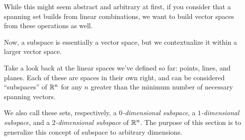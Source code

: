 \documentclass{ximera}
\begin{document}
  While this might seem abstract and arbitrary at first, if you consider that a spanning set builds from linear combinations, we want to build vector spaces from these operations as well.

  Now, a subspace is essentially a vector space, but we contextualize it within a larger vector space.

Take a look back at the linear spaces we've defined so far: points, lines, and planes. Each of these are spaces in their own right, and can be considered ``subspaces'' of $\mathbb{R}^n$ for any $n$ greater than the minimum number of necessary spanning vectors.

\begin{center}
\end{center}
We also call these sets, respectively, a {\em $0$-dimensional
  subspace}, a {\em $1$-dimensional subspace}, and a {\em
  $2$-dimensional subspace} of\/ $\mathbb{R}^n$. The purpose of this section is
to generalize this concept of subspace to arbitrary dimensions.
\end{document}
